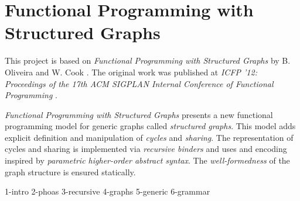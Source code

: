 \section{Functional Programming with Structured Graphs}
\label{sec:paper}

This project is based on \textit{Functional Programming with Structured Graphs} by B. Oliveira and W. Cook \cite{oliveira2012functional}. The original work was published at \textit{ICFP '12: Proceedings of the 17th ACM SIGPLAN Internal Conference of Functional Programming} \cite{icfp12}.

\textit{Functional Programming with Structured Graphs} presents a new functional programming model for generic graphs called \textit{structured graphs}. This model adds explicit definition and manipulation of \textit{cycles} and \textit{sharing}. The representation of cycles and sharing is implemented via \textit{recursive binders} and uses and encoding inspired by \textit{parametric higher-order abstract syntax}. The \textit{well-formedness} of the graph structure is ensured statically.

{1-intro}
{2-phoas}
{3-recursive}
{4-graphs}
{5-generic}
{6-grammar}
